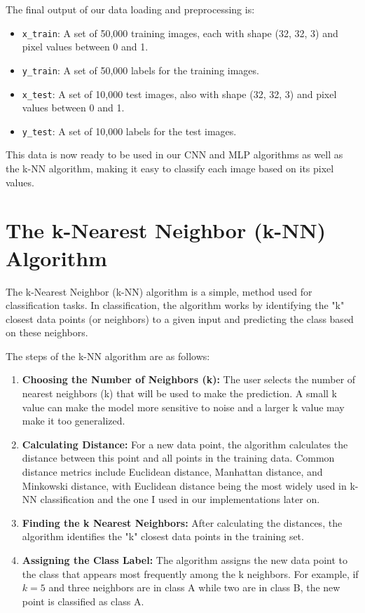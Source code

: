 \documentclass[lettersize,journal]{IEEEtran}
\begin{document}
The final output of our data loading and preprocessing is:
\begin{itemize}
    \item \texttt{x\_train}: A set of 50,000 training images, each with shape (32, 32, 3) and pixel values between 0 and 1.
    \item \texttt{y\_train}: A set of 50,000 labels for the training images.
    \item \texttt{x\_test}: A set of 10,000 test images, also with shape (32, 32, 3) and pixel values between 0 and 1.
    \item \texttt{y\_test}: A set of 10,000 labels for the test images.
\end{itemize}
\vspace{0.3cm}
This data is now ready to be used in our CNN and MLP algorithms as well as the k-NN algorithm, making it easy to classify each image based on its pixel values.


\section{The k-Nearest Neighbor (k-NN) Algorithm}

The k-Nearest Neighbor (k-NN) algorithm is a simple, method used for classification tasks. In classification, the algorithm works by identifying the "k" closest data points (or neighbors) to a given input and predicting the class based on these neighbors.

The steps of the k-NN algorithm are as follows:

\begin{enumerate}
    \item \textbf{Choosing the Number of Neighbors (k):} The user selects the number of nearest neighbors (k) that will be used to make the prediction. A small k value can make the model more sensitive to noise and a larger k value may make it too generalized.
    
    \item \textbf{Calculating Distance:} For a new data point, the algorithm calculates the distance between this point and all points in the training data. Common distance metrics include Euclidean distance, Manhattan distance, and Minkowski distance, with Euclidean distance being the most widely used in k-NN classification and the one I used in our implementations later on.
    
    \item \textbf{Finding the k Nearest Neighbors:} After calculating the distances, the algorithm identifies the "k" closest data points in the training set.
    
    \item \textbf{Assigning the Class Label:} The algorithm assigns the new data point to the class that appears most frequently among the k neighbors. For example, if $k=5$ and three neighbors are in class A while two are in class B, the new point is classified as class A.
\end{enumerate}
\end{document}
